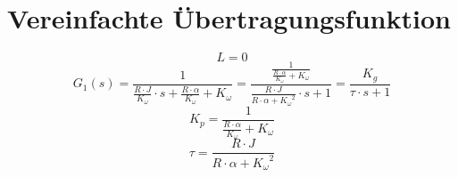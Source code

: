 \section{Vereinfachte Übertragungsfunktion}
\[ L = 0 \]
\[
    G_1(s) 
    = \frac{1}{\frac{R \cdot J}{K_\omega} \cdot s 
    + \frac{R \cdot \alpha}{K_\omega} + K_\omega}
    = \frac{\frac{1}{\frac{R \cdot \alpha}{K_\omega} + K_\omega}}
    {\frac{R \cdot J}{R \cdot \alpha + {K_\omega}^2} \cdot s + 1}
    = \frac{K_g}{\tau \cdot s + 1}
\]
\[ K_p = \frac{1}{\frac{R \cdot \alpha}{K_\omega} + K_\omega} \]
\[ \tau = \frac{R \cdot J}{R \cdot \alpha + {K_\omega}^2} \]
